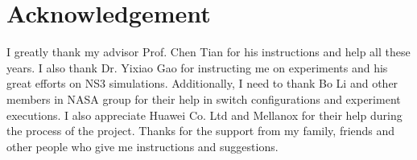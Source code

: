 \documentclass[12pt,a4paper]{article}
\begin{document}
\section*{Acknowledgement}

I greatly thank my advisor Prof. Chen Tian for his instructions and help all these years.
I also thank Dr. Yixiao Gao for instructing me on experiments and his great efforts on NS3 simulations.
Additionally, I need to thank Bo Li and other members in NASA group for their help in switch configurations and experiment executions.
I also appreciate Huawei Co. Ltd and Mellanox for their help during the process of the project.
Thanks for the support from my family, friends and other people who give me instructions and suggestions.




\end{document}
